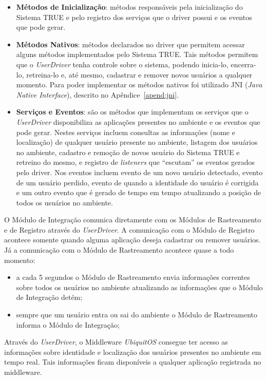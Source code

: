 \begin{itemize}
	\item \textbf{Métodos de Inicialização}: métodos responsáveis pela inicialização do Sistema TRUE e pelo registro dos serviços que o driver possui e os eventos que pode gerar.

	\item \textbf{Métodos Nativos}: métodos declarados no driver que permitem acessar alguns métodos implementados pelo Sistema TRUE. Tais métodos permitem que o \textit{UserDriver} tenha controle sobre o sistema, podendo inicia-lo, encerra-lo, retreina-lo e, até mesmo, cadastrar e remover novos usuários a qualquer momento. Para poder implementar os métodos nativos foi utilizado JNI (\textit{Java Native Interface}), descrito no Apêndice~\ref{apend:jni}.

	\item \textbf{Serviços e Eventos}: são os métodos que implementam os serviços que o \textit{UserDriver} disponibiliza as aplicações presentes no ambiente e os eventos que pode gerar. Nestes serviços incluem consultas as informações (nome e localização) de qualquer usuário presente no ambiente, listagem dos usuários no ambiente, cadastro e remoção de novos usuário do Sistema TRUE e retreino do mesmo, e registro de \textit{listeners} que ``escutam'' os eventos gerados pelo driver. Nos eventos incluem evento de um novo usuário detectado, evento de um usuário perdido, evento de quando a identidade do usuário é corrigida e um outro evento que é gerado de tempo em tempo atualizando a posição de todos os usuários no ambiente.
\end{itemize}

O Módulo de Integração comunica diretamente com os Módulos de Rastreamento e de Registro através do \textit{UserDriver}. A comunicação com o Módulo de Registro acontece somente quando alguma aplicação deseja cadastrar ou remover usuários. Já a comunicação com o Módulo de Rastreamento acontece quase a todo momento: 

	\begin{itemize}
		\item a cada 5 segundos o Módulo de Rastreamento envia informações correntes sobre todos os usuários no ambiente atualizando as informações que o Módulo de Integração detém;
		\item sempre que um usuário entra ou sai do ambiente o Módulo de Rastreamento informa o Módulo de Integração;
	\end{itemize} 

Através do \textit{UserDriver}, o Middleware \textit{UbiquitOS} consegue ter acesso as informações sobre identidade e localização dos usuários presentes no ambiente em tempo real. Tais informações ficam disponíveis a qualquer aplicação registrada no middleware. 
